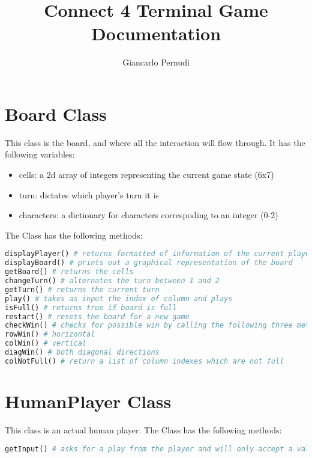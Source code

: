 \documentclass[12pt]{article}
\title{Connect 4 Terminal Game Documentation}
\author{Giancarlo Pernudi}
\begin{document}
\maketitle

\section{Board Class}

This class is the board, and where all the interaction will flow through. It has the following variables:
\begin{itemize}
  \item cells: a 2d array of integers representing the current game state (6x7)
  \item turn: dictates which player's turn it is
  \item characters: a dictionary for characters correspoding to an integer (0-2)
\end{itemize}


The Class has the following methods:
\begin{lstlisting}[language=Python]
displayPlayer() # returns formatted of information of the current player's turn and their token character
displayBoard() # prints out a graphical representation of the board
getBoard() # returns the cells
changeTurn() # alternates the turn between 1 and 2
getTurn() # returns the current turn
play() # takes as input the index of column and plays
isFull() # returns true if board is full
restart() # resets the board for a new game
checkWin() # checks for possible win by calling the following three methods:
rowWin() # horizontal
colWin() # vertical
diagWin() # both diagonal directions
colNotFull() # return a list of column indexes which are not full
\end{lstlisting}

\pagebreak

\section{HumanPlayer Class}


This class is an actual human player. The Class has the following methods:
\begin{lstlisting}[language=Python]
getInput() # asks for a play from the player and will only accept a valid response. Will ask again if necessary. 
\end{lstlisting}
\end{document}
